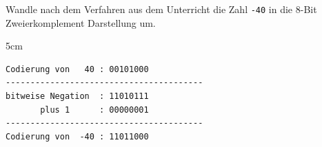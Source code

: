 \question[3]
 Wandle nach dem Verfahren aus dem Unterricht die Zahl  \texttt{-40} in die 8-Bit Zweierkomplement Darstellung um.

\begin{solutionbox}{5cm}
\begin{lstlisting}
Codierung von   40 : 00101000
----------------------------------------
bitweise Negation  : 11010111
       plus 1      : 00000001
----------------------------------------
Codierung von  -40 : 11011000
\end{lstlisting}
\end{solutionbox}
